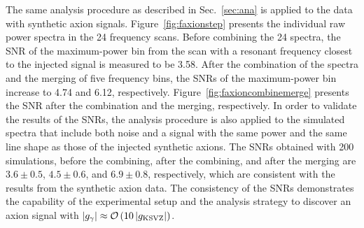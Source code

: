 The same analysis procedure as described in Sec.~\ref{sec:ana} is applied 
to the data with synthetic axion signals. 
Figure~\ref{fig:faxionstep} presents the individual raw power spectra in 
the 24 frequency scans. Before combining 
the 24 spectra, the SNR of the maximum-power bin from the scan with a resonant 
frequency closest to the injected signal is measured to be 
3.58. %
After the combination of the spectra and the merging of five frequency 
bins, the SNRs of the maximum-power bin increase to 4.74 and 6.12, 
respectively. Figure~\ref{fig:faxioncombinemerge} presents 
the SNR after the combination and the merging, respectively.    
%
In order to 
validate the results of the SNRs, the analysis procedure is also applied  
to the simulated spectra that include both noise and a signal with the 
same power and the same line shape as those of the injected synthetic axions. 
The SNRs obtained with 200 simulations, before 
the combining, after the combining, and after the merging are %
$3.6\pm 0.5$, $4.5\pm0.6$, and $6.9\pm0.8$, respectively, 
which are 
consistent with the results from the synthetic axion data.  
The consistency of the SNRs demonstrates 
the capability of the experimental setup and the analysis strategy to discover 
an axion signal with 
$\left|g_{\gamma}\right|\approx {\cal O}\left(10\left|g_\text{KSVZ}\right|\right)$.



